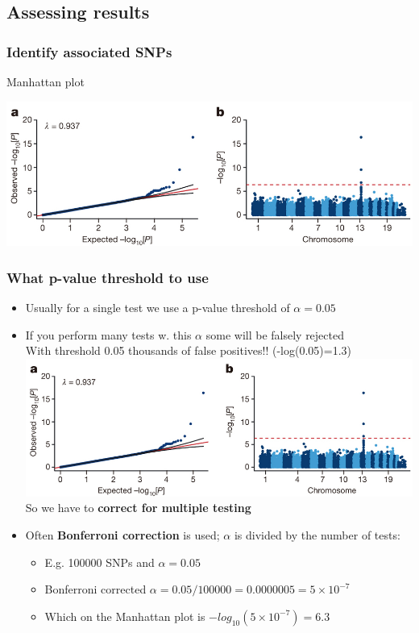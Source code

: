 \documentclass[xcolor=pdftex,dvipsnames,table,10pt]{beamer}
\begin{document}
\subsection{Assessing results}
\begin{frame}
  \frametitle{Identify associated SNPs}
\begin{block}{Manhattan plot}
   \vspace{0.4cm}
    
      \scalebox{0.42} {
        \includegraphics[trim = 170mm 0mm 0mm 12.5mm, clip]{nature13425-f2.jpg}
      }
\end{block}
\end{frame}

\begin{frame}
  \frametitle{What p-value threshold to use}
\small
\begin{itemize}
\item<1-> Usually for a single test we use a p-value threshold of $\alpha=0.05$ 
\item<2-> If you perform many tests w. this $\alpha$ some will be falsely rejected\\
With threshold 0.05 thousands of false positives!! (-log(0.05)=1.3)\\
\vspace{0.2cm}
 \scalebox{0.32} {
        \includegraphics[trim = 170mm 10mm 0mm 12.5mm, clip]{nature13425-f2.jpg}
      }   \\
    So we have to \textbf{correct for multiple testing}
    \item<3-> Often \textbf{Bonferroni correction} is used; $\alpha$ is divided by the number of tests: 
      \begin{itemize}
      \item E.g. 100000 SNPs and $\alpha=0.05$
      \item Bonferroni corrected $\alpha =0.05/100000=0.0000005 = 5\times10^{-7}$ 
      \item Which on the Manhattan plot is $-log_{10}(5\times10^{-7})=6.3$
      \end{itemize}
\end{itemize}
\end{frame}
\end{document}
